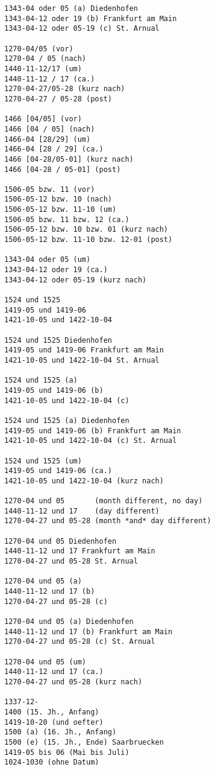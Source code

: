 \begin{verbatim}
1343-04 oder 05 (a) Diedenhofen
1343-04-12 oder 19 (b) Frankfurt am Main
1343-04-12 oder 05-19 (c) St. Arnual

1270-04/05 (vor)
1270-04 / 05 (nach)
1440-11-12/17 (um)
1440-11-12 / 17 (ca.)
1270-04-27/05-28 (kurz nach)
1270-04-27 / 05-28 (post)

1466 [04/05] (vor)
1466 [04 / 05] (nach)
1466-04 [28/29] (um)
1466-04 [28 / 29] (ca.)
1466 [04-28/05-01] (kurz nach)
1466 [04-28 / 05-01] (post)

1506-05 bzw. 11 (vor)
1506-05-12 bzw. 10 (nach)
1506-05-12 bzw. 11-10 (um)
1506-05 bzw. 11 bzw. 12 (ca.)
1506-05-12 bzw. 10 bzw. 01 (kurz nach)
1506-05-12 bzw. 11-10 bzw. 12-01 (post)

1343-04 oder 05 (um)
1343-04-12 oder 19 (ca.)
1343-04-12 oder 05-19 (kurz nach)

1524 und 1525
1419-05 und 1419-06
1421-10-05 und 1422-10-04

1524 und 1525 Diedenhofen
1419-05 und 1419-06 Frankfurt am Main
1421-10-05 und 1422-10-04 St. Arnual

1524 und 1525 (a)
1419-05 und 1419-06 (b)
1421-10-05 und 1422-10-04 (c)

1524 und 1525 (a) Diedenhofen
1419-05 und 1419-06 (b) Frankfurt am Main
1421-10-05 und 1422-10-04 (c) St. Arnual

1524 und 1525 (um)
1419-05 und 1419-06 (ca.)
1421-10-05 und 1422-10-04 (kurz nach)

1270-04 und 05       (month different, no day)
1440-11-12 und 17    (day different)
1270-04-27 und 05-28 (month *and* day different)

1270-04 und 05 Diedenhofen
1440-11-12 und 17 Frankfurt am Main
1270-04-27 und 05-28 St. Arnual

1270-04 und 05 (a)
1440-11-12 und 17 (b)
1270-04-27 und 05-28 (c)

1270-04 und 05 (a) Diedenhofen
1440-11-12 und 17 (b) Frankfurt am Main
1270-04-27 und 05-28 (c) St. Arnual

1270-04 und 05 (um)
1440-11-12 und 17 (ca.)
1270-04-27 und 05-28 (kurz nach)

1337-12-
1400 (15. Jh., Anfang)
1419-10-20 (und oefter)
1500 (a) (16. Jh., Anfang)
1500 (e) (15. Jh., Ende) Saarbruecken
1419-05 bis 06 (Mai bis Juli)
1024-1030 (ohne Datum)
\end{verbatim}